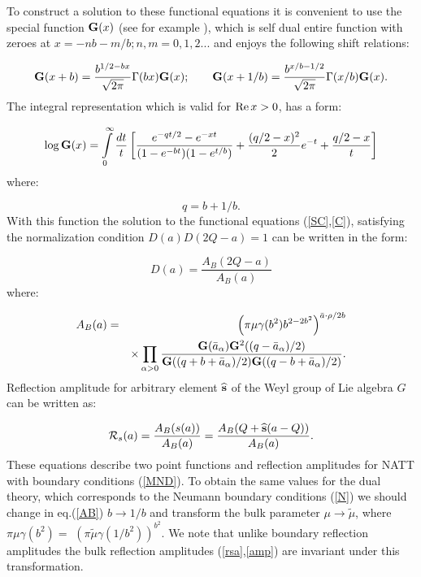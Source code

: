 \documentclass[a4paper,12pt]{article}
\begin{document}
To construct a solution to these functional equations it is convenient to
use the special function ${\bf G}(x)$ (see for example \cite{FZZA}), which
is self dual entire function with zeroes at $x=-nb-m/b;n,m=0,1,2...$ and
enjoys the following shift relations:

\begin{equation}
{\bf G}(x+b)=\frac{b^{1/2-bx}}{\sqrt{2\pi }}\Gamma (bx){\bf G}(x);\quad
\quad {\bf G}(x+1/b)=\frac{b^{x/b-1/2}}{\sqrt{2\pi }}\Gamma (x/b){\bf G}(x).
\label{GAM}
\end{equation}
The integral representation which is valid for $\mathop{\rm Re}x>0$, has a form:

\begin{equation}
\log {\bf G}(x)=\int\limits_0^\infty \frac{dt}t\left[ \frac{e^{-qt/2}-e^{-xt}
}{(1-e^{-bt})(1-e^{t/b})}+\frac{(q/2-x)^2}2e^{-t}+\frac{q/2-x}t\right]
\label{IR}
\end{equation}
where:

\begin{equation}
q=b+1/b.  \label{Q}
\end{equation}
With this function the solution to the functional equations (\ref{SC},\ref{C}), 
satisfying the normalization condition $D(a)D(2Q-a)=1$ can be written in
the form:

\begin{equation}
D(a)=\frac{A_B(2Q-a)}{A_B(a)}  \label{DA}
\end{equation}
where:

\begin{eqnarray}
A_B(a)&=&\left( \pi \mu \gamma (b^2)b^{2-2b^2}\right) ^{\bar{a}\cdot\rho/2b}
\nonumber \\
&&\times
\prod\limits_{\alpha>0}\frac{{\bf G}(\bar{a}_\alpha ){\bf G}^2((q-
\bar{a}_\alpha )/2)}{{\bf G}((q+b+\bar{a}_\alpha )/2){\bf G}((q-b+\bar{a}
_\alpha )/2)}.  \label{AB}
\end{eqnarray}
Reflection amplitude for arbitrary element $\widehat{{\bf s}}$ of the Weyl
group of Lie algebra $G$ can be written as:

\begin{equation}
{\cal R}_s(a)=\frac{A_B(s(a))}{A_B(a)}=\frac{A_B(Q+\widehat{{\bf s}}(a-Q))}
{A_B(a)}.  \label{RS}
\end{equation}
These equations describe two point functions and reflection amplitudes for
NATT with boundary conditions (\ref{MND}). To obtain the same values for the
dual theory, which corresponds to the Neumann boundary conditions (\ref{N})
we should change in eq.(\ref{AB}) $b\rightarrow 1/b$ and transform the bulk
parameter $\mu \rightarrow \widetilde{\mu }$, where $\pi \mu \gamma (b^2)=$ 
$(\pi \widetilde{\mu }\gamma (1/b^2))^{b^2}$. We note that unlike boundary
reflection amplitudes the bulk reflection amplitudes (\ref{rsa},\ref{amp})
are invariant under this transformation.
\end{document}
